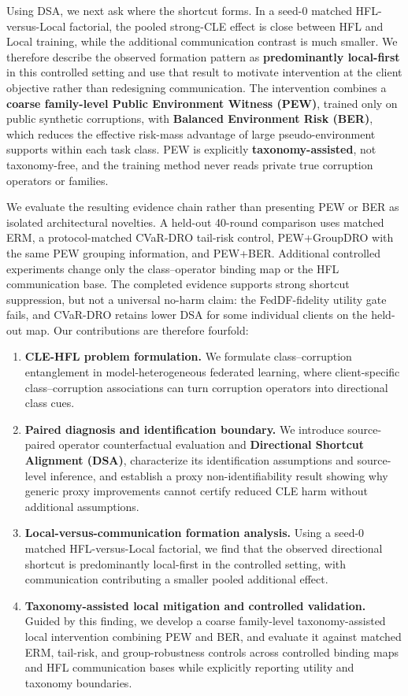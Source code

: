 Using DSA, we next ask where the shortcut forms. In a seed-0 matched HFL-versus-Local factorial, the pooled strong-CLE effect is close between HFL and Local training, while the additional communication contrast is much smaller. We therefore describe the observed formation pattern as \textbf{predominantly local-first} in this controlled setting and use that result to motivate intervention at the client objective rather than redesigning communication. The intervention combines a \textbf{coarse family-level Public Environment Witness (PEW)}, trained only on public synthetic corruptions, with \textbf{Balanced Environment Risk (BER)}, which reduces the effective risk-mass advantage of large pseudo-environment supports within each task class. PEW is explicitly \textbf{taxonomy-assisted}, not taxonomy-free, and the training method never reads private true corruption operators or families.

We evaluate the resulting evidence chain rather than presenting PEW or BER as isolated architectural novelties. A held-out 40-round comparison uses matched ERM, a protocol-matched CVaR-DRO tail-risk control, PEW+GroupDRO with the same PEW grouping information, and PEW+BER. Additional controlled experiments change only the class--operator binding map or the HFL communication base. The completed evidence supports strong shortcut suppression, but not a universal no-harm claim: the FedDF-fidelity utility gate fails, and CVaR-DRO retains lower DSA for some individual clients on the held-out map. Our contributions are therefore fourfold:

\begin{enumerate}
\item \textbf{CLE-HFL problem formulation.} We formulate class--corruption entanglement in model-heterogeneous federated learning, where client-specific class--corruption associations can turn corruption operators into directional class cues.
\item \textbf{Paired diagnosis and identification boundary.} We introduce source-paired operator counterfactual evaluation and \textbf{Directional Shortcut Alignment (DSA)}, characterize its identification assumptions and source-level inference, and establish a proxy non-identifiability result showing why generic proxy improvements cannot certify reduced CLE harm without additional assumptions.
\item \textbf{Local-versus-communication formation analysis.} Using a seed-0 matched HFL-versus-Local factorial, we find that the observed directional shortcut is predominantly local-first in the controlled setting, with communication contributing a smaller pooled additional effect.
\item \textbf{Taxonomy-assisted local mitigation and controlled validation.} Guided by this finding, we develop a coarse family-level taxonomy-assisted local intervention combining PEW and BER, and evaluate it against matched ERM, tail-risk, and group-robustness controls across controlled binding maps and HFL communication bases while explicitly reporting utility and taxonomy boundaries.
\end{enumerate}

